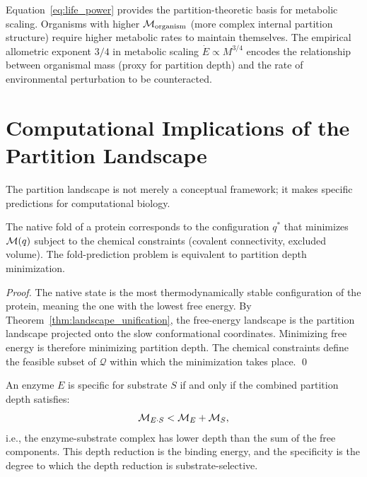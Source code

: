 \begin{remark}
Equation~\eqref{eq:life_power} provides the partition-theoretic basis for
metabolic scaling. Organisms with higher $\mathcal{M}_{\mathrm{organism}}$
(more complex internal partition structure) require higher metabolic rates
to maintain themselves. The empirical allometric exponent $3/4$ in metabolic
scaling $\dot{E} \propto M^{3/4}$ encodes the relationship between organismal
mass (proxy for partition depth) and the rate of environmental perturbation
to be counteracted.
\end{remark}

\section{Computational Implications of the Partition Landscape}
\label{sec:computational_implications}

The partition landscape is not merely a conceptual framework; it makes specific
predictions for computational biology.

\begin{proposition}
\label{prop:fold_depth_min}
The native fold of a protein corresponds to the configuration $q^*$ that
minimizes $\mathcal{M}(q)$ subject to the chemical constraints (covalent connectivity,
excluded volume). The fold-prediction problem is equivalent to partition depth
minimization.
\end{proposition}

\begin{proof}
The native state is the most thermodynamically stable configuration of the
protein, meaning the one with the lowest free energy. By
Theorem~\ref{thm:landscape_unification}, the free-energy landscape is the
partition landscape projected onto the slow conformational coordinates.
Minimizing free energy is therefore minimizing partition depth. The chemical
constraints define the feasible subset of $\mathcal{Q}$ within which the
minimization takes place. \qed
\end{proof}

\begin{proposition}
\label{prop:depth_compatibility}
An enzyme $E$ is specific for substrate $S$ if and only if the combined
partition depth satisfies:
\begin{equation}
  \mathcal{M}_{E \cdot S} < \mathcal{M}_E + \mathcal{M}_S,
\end{equation}
i.e., the enzyme-substrate complex has lower depth than the sum of the free
components. This depth reduction is the binding energy, and the specificity
is the degree to which the depth reduction is substrate-selective.
\end{proposition}

